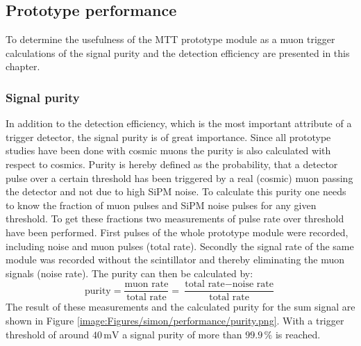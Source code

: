 \subsection{Prototype performance}
\label{section:simon/performance}
To determine the usefulness of the MTT prototype module as a muon trigger calculations of the signal purity and the detection efficiency are presented in this chapter.
\subsubsection{Signal purity}
In addition to the detection efficiency, which is the most important attribute of a trigger detector, the signal purity is of great importance. Since all prototype studies have been done with cosmic muons the purity is also calculated with respect to cosmics. Purity is hereby defined as the probability, that a detector pulse over a certain threshold has been triggered by a real (cosmic) muon passing the detector and not due to high SiPM noise. To calculate this purity one needs to know the fraction of muon pulses and SiPM noise pulses for any given threshold. To get these fractions two measurements of pulse rate over threshold have been performed. First pulses of the whole prototype module were recorded, including noise and muon pulses (total rate). Secondly the signal rate of the same module was recorded without the scintillator and thereby eliminating the muon signals (noise rate). The purity can then be calculated by:
\begin{equation}
 \text{purity} = \frac{\text{muon rate}}{\text{total rate}} = \frac{\text{total rate} - \text{noise rate}}{\text{total rate}}
\end{equation}
The result of these measurements and the calculated purity for the sum signal are shown in Figure \ref{image:Figures/simon/performance/purity.png}. With a trigger threshold of around $40\,\text{mV}$ a signal purity of more than $99.9\,\%$ is reached.
%

